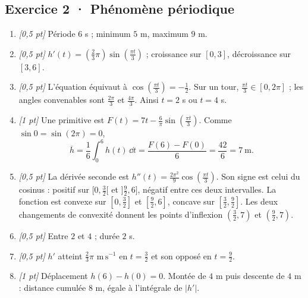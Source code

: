 \subsection*{Exercice 2 · Phénomène périodique}\begin{enumerate}

\item \textit{[0,5 pt]} Période $6$ s ; minimum $5$ m, maximum $9$ m.

\item \textit{[0,5 pt]} $h'(t)=(\frac{2}{3}\pi)\sin (\frac{\pi t}{3})$ ; croissance sur $[0,3]$, décroissance sur $[3,6]$.

\item \textit{[0,5 pt]} L'équation équivaut à $\cos (\frac{\pi t}{3})=-\frac{1}{2}$. Sur un tour, $\frac{\pi t}{3}\in[0,2\pi]$ ; les angles convenables sont $\frac{2\pi}{3}$ et $\frac{4\pi}{3}$. Ainsi $t=2$ s ou $t=4$ s.

\item \textit{[1 pt]} Une primitive est $F(t)=7t-\frac{6}{\pi}\sin (\frac{\pi t}{3})$. Comme $\sin0=\sin(2\pi)=0$,
\[\overline h=\frac{1}{6}\int_0^{6}h(t)\,\dd t=\frac{F(6)-F(0)}{6}=\frac{42}{6}=7\ \mathrm{m}.\]

\item \textit{[0,5 pt]} La dérivée seconde est $h''(t)=\frac{2\pi^2}{9}\cos (\frac{\pi t}{3})$. Son signe est celui du cosinus : positif sur $[0,\frac{3}{2}[$ et $]\frac{9}{2},6]$, négatif entre ces deux intervalles. La fonction est convexe sur $[0,\frac{3}{2}]$ et $[\frac{9}{2},6]$, concave sur $[\frac{3}{2},\frac{9}{2}]$. Les deux changements de convexité donnent les points d'inflexion $(\frac{3}{2},7)$ et $(\frac{9}{2},7)$.

\item \textit{[0,5 pt]} Entre $2$ et $4$ ; durée $2$ s.

\item \textit{[0,5 pt]} $h'$ atteint $\frac{2}{3}\pi$ $\mathrm{m\,s^{-1}}$ en $t=\frac{3}{2}$ et son opposé en $t=\frac{9}{2}$.

\item \textit{[1 pt]} Déplacement $h(6)-h(0)=0$. Montée de $4$ m puis descente de $4$ m : distance cumulée $8$ m, égale à l'intégrale de $|h'|$.

\end{enumerate}

